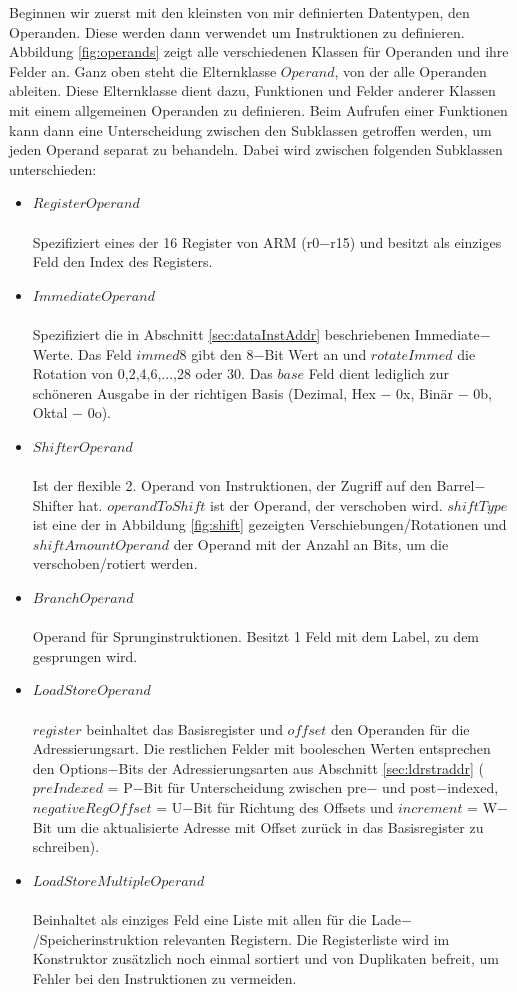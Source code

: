 \documentclass[a4paper, 11pt, onecolumn]{article}
\begin{document}
Beginnen wir zuerst mit den kleinsten von mir definierten Datentypen, den Operanden. Diese werden dann verwendet um Instruktionen zu definieren. Abbildung \ref{fig:operands} zeigt alle verschiedenen Klassen für Operanden und ihre Felder an. Ganz oben steht die Elternklasse $Operand$, von der alle Operanden ableiten. Diese Elternklasse dient dazu, Funktionen und Felder anderer Klassen mit einem allgemeinen Operanden zu definieren. Beim Aufrufen einer Funktionen kann dann eine Unterscheidung zwischen den Subklassen getroffen werden, um jeden Operand separat zu behandeln. Dabei wird zwischen folgenden Subklassen unterschieden:

\begin{itemize}
\item $RegisterOperand$\\ \\Spezifiziert eines der 16 Register von ARM (r0$-$r15) und besitzt als einziges Feld den Index des Registers.
\item $ImmediateOperand$\\ \\Spezifiziert die in Abschnitt \ref{sec:dataInstAddr} beschriebenen Immediate$-$Werte. Das Feld $immed8$ gibt den 8$-$Bit Wert an und $rotateImmed$ die Rotation von 0,2,4,6,...,28 oder 30. Das $base$ Feld dient lediglich zur schöneren Ausgabe in der richtigen Basis (Dezimal, Hex $-$ 0x, Binär $-$ 0b, Oktal $-$ 0o).
\newpage
\item $ShifterOperand$\\ \\Ist der flexible 2. Operand von Instruktionen, der Zugriff auf den Barrel$-$Shifter hat. $operandToShift$ ist der Operand, der verschoben wird. $shiftType$ ist eine der in Abbildung \ref{fig:shift} gezeigten Verschiebungen/Rotationen und $shiftAmountOperand$ der Operand mit der Anzahl an Bits, um die verschoben/rotiert werden.
\item $BranchOperand$\\ \\Operand für Sprunginstruktionen. Besitzt 1 Feld mit dem Label, zu dem gesprungen wird.
\item $LoadStoreOperand$\\ \\$register$ beinhaltet das Basisregister und $offset$ den Operanden für die Adressierungsart. Die restlichen Felder mit booleschen Werten entsprechen den Options$-$Bits der Adressierungsarten aus Abschnitt \ref{sec:ldrstraddr} ($preIndexed$ = P$-$Bit für Unterscheidung zwischen pre$-$ und post$-$indexed, $negativeRegOffset$ = U$-$Bit für Richtung des Offsets und $increment$ = W$-$Bit um die aktualisierte Adresse mit Offset zurück in das Basisregister zu schreiben).
\item $LoadStoreMultipleOperand$\\ \\
Beinhaltet als einziges Feld eine Liste mit allen für die Lade$-$/Speicherinstruktion relevanten Registern. Die Registerliste wird im Konstruktor zusätzlich noch einmal sortiert und von Duplikaten befreit, um Fehler bei den Instruktionen zu vermeiden.
\end{itemize}
\end{document}
